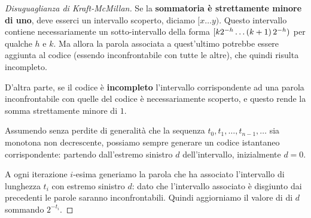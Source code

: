 \documentclass[\main/main.tex]{subfiles}
\begin{document}
\begin{proof}[Disuguaglianza di Kraft-McMillan]
    Se la \textbf{sommatoria è strettamente minore di uno}, deve esserci un intervallo scoperto, diciamo \([x\ldots y)\). Questo intervallo contiene necessariamente un sotto-intervallo della forma \([k2^{-h} \ldots \left(k+1\right)2^{-h})\) per qualche \(h\) e \(k\). Ma allora la parola associata a quest'ultimo potrebbe essere aggiunta al codice (essendo inconfrontabile con tutte le altre), che quindi risulta incompleto. 
    
    D'altra parte, se il codice è \textbf{incompleto} l'intervallo corrispondente ad una parola inconfrontabile con quelle del codice è necessariamente scoperto, e questo rende la somma strettamente minore di \(1\).
    
    Assumendo senza perdite di generalità che la sequenza \(t_0, t_1, \ldots, t_{n-1}, \ldots\) sia monotona non decrescente, possiamo sempre generare un codice istantaneo corrispondente: partendo dall'estremo sinistro \(d\) dell'intervallo, inizialmente \(d=0\).
    
    A ogni iterazione \(i\)-esima generiamo la parola che ha associato l'intervallo di lunghezza \(t_i\) con estremo sinistro \(d\): dato che l'intervallo associato è disgiunto dai precedenti le parole saranno inconfrontabili. Quindi aggiorniamo il valore di di \(d\) sommando \(2^{-t_i}\).
\end{proof}
\clearpage
\end{document}
